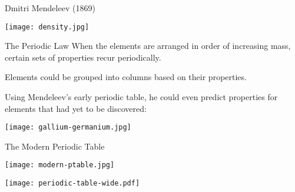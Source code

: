 \documentclass[notes=show]{beamer}
\begin{document}
\begin{frame}[allowframebreaks=1]{Dmitri Mendeleev (1869)}
	\begin{center}
		\texttt{[image: density.jpg]}
	\end{center}
	
	\begin{block}{The Periodic Law}
		When the elements are arranged in order of increasing mass,
		certain sets of properties recur periodically.
	\end{block}

	\framebreak%

	Elements could be \alert{grouped} into columns based on their properties.

	\begin{center}
	\end{center}

	\framebreak%

	Using Mendeleev's early periodic table, he could even predict properties
	for elements that had yet to be discovered:

	\bigskip

	\texttt{[image: gallium-germanium.jpg]}
\end{frame}

\begin{frame}[allowframebreaks=1]{The Modern Periodic Table}
	\centering

	\texttt{[image: modern-ptable.jpg]}

	\framebreak

	\texttt{[image: periodic-table-wide.pdf]}
\end{frame}

\end{document}
